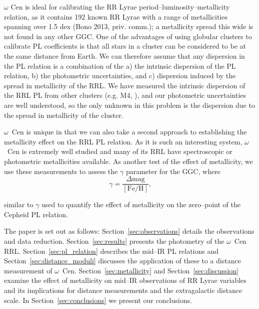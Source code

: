 \documentclass[a4paper,fleqn,usenatbib]{mnras}
\begin{document}
$\omega$ Cen is ideal for calibrating the RR Lyrae period--luminosity--metallicity relation, as it contains 192 known RR Lyrae \citep{2004A&A...424.1101K} with a range of metallicities spanning over 1.5 dex (Bono 2013, priv. comm.); a metallicity spread this wide is not found in any other GGC. One of the advantages of using globular clusters to calibrate PL coefficients is that all stars in a cluster can be considered to be at the same distance from Earth. We can therefore assume that any dispersion in the PL relation is a combination of the a) the intrinsic dispersion of the PL relation, b) the photometric uncertainties, and c) dispersion induced by the spread in metallicity of the RRL. We have measured the intrinsic dispersion of the RRL PL from other clusters (e.g. M4, \citet{2015arXiv150507858N}), and our photometric uncertainties are well understood, so the only unknown in this problem is the dispersion due to the spread in metallicity of the cluster. 

 $\omega$~Cen is unique in that we can also take a second approach to establishing the metallicity effect on the RRL PL relation. As it is such an interesting system, $\omega$~Cen is extremely well studied and many of its RRL have spectroscopic or photometric metallicities available. As another test of the effect of metallicity, we use these measurements to assess the $\gamma$ parameter for the GGC, where 
\begin{equation} \label{eqn:gamma}
\gamma = \dfrac {\Delta \text{mag}} {[\text{Fe/H}]}\text{,}
\end{equation}

similar to $\gamma$ used to quantify the effect of metallicity on the zero--point of the Cepheid PL relation. 

The paper is set out as follows: Section~\ref{sec:observations} details the observations and data reduction. Section~\ref{sec:results} presents the photometry of the $\omega$~Cen RRL. Section~\ref{sec:pl_relation} describes the mid--IR PL relations and Section~\ref{sec:distance_moduli} discusses the application of these to a distance measurement of  $\omega$~Cen. Section~\ref{sec:metallicity} and Section~\ref{sec:discussion} examine the effect of metallicity on mid--IR observations of RR Lyrae variables and its implications for distance measurements and the extragalactic distance scale. In Section~\ref{sec:conclusions} we present our conclusions.
\end{document}
